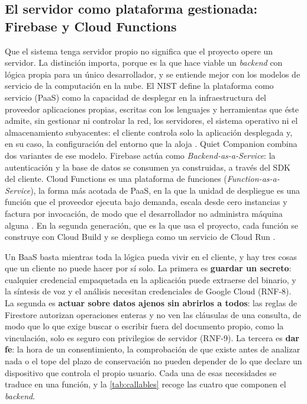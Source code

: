 \subsection{El servidor como plataforma gestionada: Firebase y Cloud Functions}
\label{sec:paas}

Que el sistema tenga servidor propio no significa que el proyecto opere un servidor. La distinción importa,
porque es la que hace viable un \emph{backend} con lógica propia para un único desarrollador, y se entiende
mejor con los modelos de servicio de la computación en la nube. El NIST define la plataforma como servicio
(PaaS) como la capacidad de desplegar en la infraestructura del proveedor aplicaciones propias, escritas con
los lenguajes y herramientas que éste admite, sin gestionar ni controlar la red, los servidores, el sistema
operativo ni el almacenamiento subyacentes: el cliente controla solo la aplicación desplegada y, en su caso,
la configuración del entorno que la aloja \citep{NIST800145}. Quiet Companion combina dos variantes de ese
modelo. Firebase actúa como \emph{Backend-as-a-Service}: la autenticación y la base de datos se consumen ya
construidas, a través del SDK del cliente. Cloud Functions es una plataforma de funciones
(\emph{Function-as-a-Service}), la forma más acotada de PaaS, en la que la unidad de despliegue es una
función que el proveedor ejecuta bajo demanda, escala desde cero instancias y factura por invocación, de modo
que el desarrollador no administra máquina alguna \citep{Jonas2019}. En la segunda generación, que es la que
usa el proyecto, cada función se construye con Cloud Build y se despliega como un servicio de Cloud Run
\citep{FirebaseFunctionsVersions}.

Un BaaS basta mientras toda la lógica pueda vivir en el cliente, y hay tres cosas que un cliente no puede
hacer por sí solo. La primera es \textbf{guardar un secreto}: cualquier credencial empaquetada en la
aplicación puede extraerse del binario, y la síntesis de voz y el análisis necesitan credenciales de Google
Cloud (RNF-8). La segunda es \textbf{actuar sobre datos ajenos sin abrirlos a todos}: las reglas de Firestore
autorizan operaciones enteras y no ven las cláusulas de una consulta, de modo que lo que exige buscar o
escribir fuera del documento propio, como la vinculación, solo es seguro con privilegios de servidor
(RNF-9). La tercera es \textbf{dar fe}: la hora de un consentimiento, la comprobación de que existe antes de
analizar nada o el tope del plazo de conservación no pueden depender de lo que declare un dispositivo que
controla el propio usuario. Cada una de esas necesidades se traduce en una función, y la
\autoref{tab:callables} recoge las cuatro que componen el \emph{backend}.

